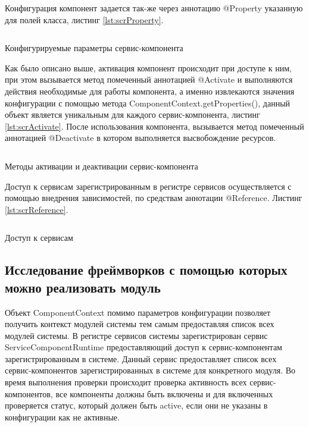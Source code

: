 Конфигурация компонент задается так-же через аннотацию @Property указанную для полей класса, листинг \ref{lst:scrProperty}. 

\begin{listing}[H]
\inputminted[linenos,frame=single]{java}{inc/src/scrProperty}
\caption{Конфигурируемые параметры сервис-компонента} 
\label{lst:scrProperty}
\end{listing}

Как было описано выше, активация компонент происходит при доступе к ним, при этом вызывается метод помеченный аннотацией @Activate и выполняются действия необходимые для работы компонента, а именно извлекаются значения конфигурации с помощью метода ComponentContext.getProperties(), данный объект является уникальным для каждого сервис-компонента, листинг \ref{lst:scrActivate}. После использования компонента, вызывается метод помеченный аннотацией @Deactivate в котором выполняется высвобождение ресурсов.

\begin{listing}[H]
\inputminted[linenos,frame=single]{java}{inc/src/scrActivate}
\caption{Методы активации и деактивации сервис-компонента} 
\label{lst:scrActivate}
\end{listing}

Доступ к сервисам зарегистрированным в регистре сервисов осуществляется с помощью внедрения зависимостей, по средствам аннотации @Reference. Листинг \ref{lst:scrReference}.

\begin{listing}[H]
\inputminted[linenos,frame=single]{java}{inc/src/scrReference}
\caption{Доступ к сервисам} 
\label{lst:scrReference}
\end{listing}

\subsection{Исследование фреймворков с помощью которых можно реализовать модуль}
Объект ComponentContext помимо параметров конфигурации позволяет получить контекст модулей системы тем самым предоставляя список всех модулей системы. В регистре сервисов системы зарегистрирован сервис ServiceComponentRuntime предоставляющий доступ к сервис-компонентам зарегистрированным в системе. Данный сервис предоставляет список всех сервис-компонентов зарегистрированных в системе для конкретного модуля. Во время выполнения проверки происходит проверка активность всех сервис-компонентов, все компоненты должны быть включены и для включенных проверяется статус, который должен быть active, если они не указаны в конфигурации как не активные.

